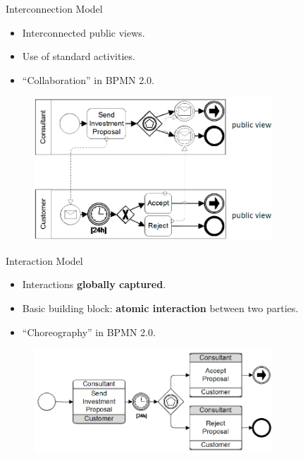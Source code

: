 \documentclass[xcolor=svgnames]{beamer}
\begin{document}
  \begin{frame}{Interconnection Model}
      \begin{itemize}
	\item Interconnected public views.	
	\item Use of standard activities.
 	\item ``Collaboration'' in BPMN 2.0.
      \end{itemize}
   \begin{figure}[!h]
	    \centering
	    \includegraphics[width=0.8\textwidth]{interconnection_choreography.png}
    \end{figure}	
  \end{frame}


  \begin{frame}{Interaction Model}
    \begin{itemize}
	  \item Interactions \textbf{globally captured}.	
	  \item Basic building block: \textbf{atomic interaction} between two parties.
	  \item ``Choreography'' in BPMN 2.0.
	\end{itemize}
    \begin{figure}[!h]
	      \centering
	      \includegraphics[width=0.8\textwidth]{interaction_choreography.png}
      \end{figure}	
  \end{frame}
\end{document}
